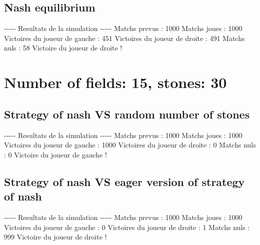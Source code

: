 \documentclass{article}%
\begin{document}
%
\subsection{Nash equilibrium}%
\label{subsec:Nash equilibrium}%
{-}{-}{-}{-}{-} Resultats de la simulation {-}{-}{-}{-}{-}\newline%
		\newline%
Matchs prevus : 1000\newline%
Matchs joues : 1000\newline%
\newline%
Victoires du joueur de gauche : 451\newline%
Victoires du joueur de droite : 491\newline%
Matchs nuls : 58\newline%
\newline%
Victoire du joueur de droite !

%
\section{Number of fields: 15, stones: 30}%
\label{sec:Number of fields 15, stones 30}%
\subsection{Strategy of nash VS random number of stones}%
\label{subsec:Strategy of nash VS random number of stones}%
{-}{-}{-}{-}{-} Resultats de la simulation {-}{-}{-}{-}{-}\newline%
		\newline%
Matchs prevus : 1000\newline%
Matchs joues : 1000\newline%
\newline%
Victoires du joueur de gauche : 1000\newline%
Victoires du joueur de droite : 0\newline%
Matchs nuls : 0\newline%
\newline%
Victoire du joueur de gauche !

%
\subsection{Strategy of nash VS eager version of strategy of nash}%
\label{subsec:Strategy of nash VS eager version of strategy of nash}%
{-}{-}{-}{-}{-} Resultats de la simulation {-}{-}{-}{-}{-}\newline%
		\newline%
Matchs prevus : 1000\newline%
Matchs joues : 1000\newline%
\newline%
Victoires du joueur de gauche : 0\newline%
Victoires du joueur de droite : 1\newline%
Matchs nuls : 999\newline%
\newline%
Victoire du joueur de droite !
\end{document}
